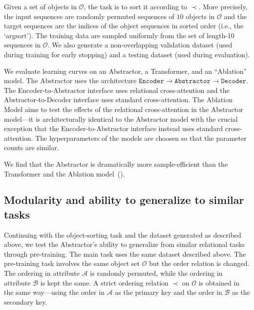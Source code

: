Given a set of objects in $\mathcal{O}$, the task is to sort it according to $\prec$. More precisely, the input sequences are randomly permuted sequences of $10$ objects in $\mathcal{O}$ and the target sequences are the indices of the object sequences in sorted order (i.e., the `argsort'). The training data are sampled uniformly from the set of length-10 sequences in $\mathcal{O}$. We also generate a non-overlapping validation dataset (used during training for early stopping) and a testing dataset (used during evaluation).

We evaluate learning curves on an Abstractor, a Transformer, and an ``Ablation'' model. The Abstractor uses the architecture $\texttt{Encoder} \to \texttt{Abstractor} \to \texttt{Decoder}$. The Encoder-to-Abstractor interface uses relational cross-attention and the Abstractor-to-Decoder interface uses standard cross-attention. The Ablation Model aims to test the effects of the relational cross-attention in the Abstractor model---it is architecturally identical to the Abstractor model with the crucial exception that the Encoder-to-Abstractor interface instead uses standard cross-attention. The hyperparameters of the models are choosen so that the parameter counts are similar. %

We find that the Abstractor is dramatically more sample-efficient than the Transformer and the Ablation model~().

\subsection{Modularity and ability to generalize to similar tasks}

Continuing with the object-sorting task and the dataset generated as described above, we test the Abstractor's ability to generalize from similar relational tasks through pre-training. The main task uses the same dataset described above. The pre-training task involves the same object set $\mathcal{O}$ but the order relation is changed. The ordering in attribute $\mathcal{A}$ is randomly permuted, while the ordering in attribute $\mathcal{B}$ is kept the same. A strict ordering relation $\prec$ on $\mathcal{O}$ is obtained in the same way---using the order in $\mathcal{A}$ as the primary key and the order in $\mathcal{B}$ as the secondary key.

